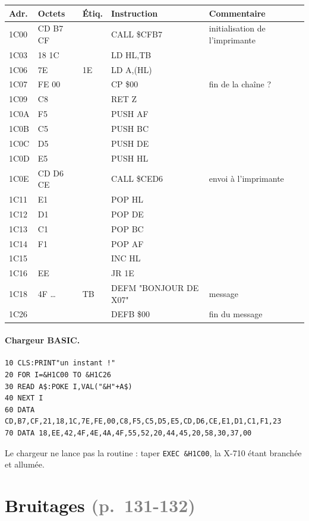 \documentclass[a4paper,10pt]{article}
\makeatletter
\newcommand{\pg}[1]{\texorpdfstring{\textcolor{gray}{\small(p.~#1)}}{}}
\newenvironment{asm}
  {\small\begin{longtable}{@{}>{\ttfamily}l>{\ttfamily}l>{\ttfamily}l>{\ttfamily}l>{\raggedright\arraybackslash}p{6.2cm}@{}}
   \toprule
   \normalfont\bfseries Adr. & \normalfont\bfseries Octets & \normalfont\bfseries Étiq. & \normalfont\bfseries Instruction & \textbf{Commentaire}\\
   \midrule\endhead
   \bottomrule\endfoot}
  {\end{longtable}}
\makeatother
\begin{document}
\begin{asm}
1C00 & CD B7 CF &    & CALL \$CFB7    & initialisation de l'imprimante \\
1C03 & 21 18 1C &    & LD HL,TB       & \\
1C06 & 7E       & 1E & LD A,(HL)      & \\
1C07 & FE 00    &    & CP \$00        & fin de la chaîne ? \\
1C09 & C8       &    & RET Z          & \\
1C0A & F5       &    & PUSH AF        & \\
1C0B & C5       &    & PUSH BC        & \\
1C0C & D5       &    & PUSH DE        & \\
1C0D & E5       &    & PUSH HL        & \\
1C0E & CD D6 CE &    & CALL \$CED6    & envoi à l'imprimante \\
1C11 & E1       &    & POP HL         & \\
1C12 & D1       &    & POP DE         & \\
1C13 & C1       &    & POP BC         & \\
1C14 & F1       &    & POP AF         & \\
1C15 & 23       &    & INC HL         & \\
1C16 & 18 EE    &    & JR 1E          & \\
1C18 & 42 4F \dots & TB & DEFM "BONJOUR DE X07" & message \\
1C26 & 00       &    & DEFB \$00      & fin du message \\
\end{asm}

\paragraph{Chargeur BASIC.}
\begin{verbatim}
10 CLS:PRINT"un instant !"
20 FOR I=&H1C00 TO &H1C26
30 READ A$:POKE I,VAL("&H"+A$)
40 NEXT I
60 DATA CD,B7,CF,21,18,1C,7E,FE,00,C8,F5,C5,D5,E5,CD,D6,CE,E1,D1,C1,F1,23
70 DATA 18,EE,42,4F,4E,4A,4F,55,52,20,44,45,20,58,30,37,00
\end{verbatim}
Le chargeur ne lance pas la routine : taper \texttt{EXEC \&H1C00}, la X-710
étant branchée et allumée.

\section{Bruitages \pg{131-132}}
\end{document}
